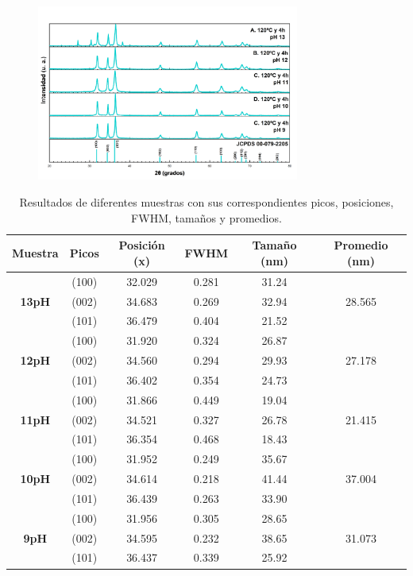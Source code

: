 \documentclass[12pt]{article}
\begin{document}
\begin{figure}[H]
    	   \begin{center}
     	  	\includegraphics[width = 0.77\textwidth]{Imagenes/ZnO_DRX_1.png}
    	   \end{center} 
        \end{figure}

\begin{table}[h]
\caption{Resultados de diferentes muestras con sus correspondientes picos, posiciones, FWHM, tamaños y promedios.}
\centering
\begin{tabular}{|c|c|c|c|c|c|}
\hline
\textbf{Muestra} & \textbf{Picos} & \textbf{Posición (x)} & \textbf{FWHM} & \textbf{Tamaño (nm)} & \textbf{Promedio (nm)} \\ \hline
 & (100) & 32.029 & 0.281 & 31.24 &  \\
\textbf{13pH} & (002) & 34.683 & 0.269 & 32.94 & \textcolor[rgb]{0.29,0.56,0.89}{28.565} \\
 & (101) & 36.479 & 0.404 & 21.52 &  \\ \hline
 & (100) & 31.920 & 0.324 & 26.87 &  \\
\textbf{12pH} & (002) & 34.560 & 0.294 & 29.93 & \textcolor[rgb]{0.29,0.56,0.89}{27.178} \\
 & (101) & 36.402 & 0.354 & 24.73 &  \\ \hline
 & (100) & 31.866 & 0.449 & 19.04 &  \\
\textbf{11pH} & (002) & 34.521 & 0.327 & 26.78 & \textcolor[rgb]{0.29,0.56,0.89}{21.415} \\
 & (101) & 36.354 & 0.468 & 18.43 &  \\ \hline
 & (100) & 31.952 & 0.249 & 35.67 &  \\
\textbf{10pH} & (002) & 34.614 & 0.218 & 41.44 & \textcolor[rgb]{0.29,0.56,0.89}{37.004} \\
 & (101) & 36.439 & 0.263 & 33.90 &  \\ \hline
 & (100) & 31.956 & 0.305 & 28.65 &  \\
\textbf{9pH} & (002) & 34.595 & 0.232 & 38.65 & \textcolor[rgb]{0.29,0.56,0.89}{31.073} \\
 & (101) & 36.437 & 0.339 & 25.92 &  \\ \hline
\end{tabular}
\label{tab:zno1DRX}
\end{table}
\end{document}
